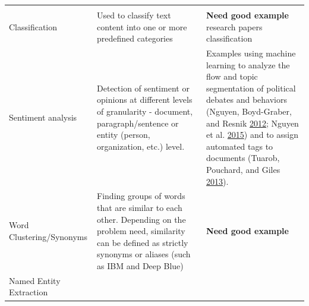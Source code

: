 \documentclass[]{krantz}
\begin{document}
\begin{longtable}[]{@{}lll@{}}
\begin{minipage}[t]{0.63\columnwidth}
\end{minipage}\tabularnewline
\begin{minipage}[t]{0.12\columnwidth}\raggedright\strut
Classification\strut
\end{minipage} & \begin{minipage}[t]{0.16\columnwidth}\raggedright\strut
Used to classify text content into one or more predefined
categories\strut
\end{minipage} & \begin{minipage}[t]{0.63\columnwidth}\raggedright\strut
\textbf{Need good example} research papers classification\strut
\end{minipage}\tabularnewline
\begin{minipage}[t]{0.12\columnwidth}\raggedright\strut
Sentiment analysis\strut
\end{minipage} & \begin{minipage}[t]{0.16\columnwidth}\raggedright\strut
Detection of sentiment or opinions at different levels of granularity -
document, paragraph/sentence or entity (person, organization, etc.)
level.\strut
\end{minipage} & \begin{minipage}[t]{0.63\columnwidth}\raggedright\strut
Examples using machine learning to analyze the flow and topic
segmentation of political debates and behaviors (Nguyen, Boyd-Graber,
and Resnik \protect\hyperlink{ref-nguyen-12}{2012}; Nguyen et al.
\protect\hyperlink{ref-Nguyen:Boyd-Graber:Resnik:Miler-2015}{2015}) and
to assign automated tags to documents (Tuarob, Pouchard, and Giles
\protect\hyperlink{ref-tuarob-13}{2013}).\strut
\end{minipage}\tabularnewline
\begin{minipage}[t]{0.12\columnwidth}\raggedright\strut
Word Clustering/Synonyms\strut
\end{minipage} & \begin{minipage}[t]{0.16\columnwidth}\raggedright\strut
Finding groups of words that are similar to each other. Depending on the
problem need, similarity can be defined as strictly synonyms or aliases
(such as IBM and Deep Blue)\strut
\end{minipage} & \begin{minipage}[t]{0.63\columnwidth}\raggedright\strut
\textbf{Need good example}\strut
\end{minipage}\tabularnewline
\begin{minipage}[t]{0.12\columnwidth}\raggedright\strut
Named Entity Extraction\strut
\end{minipage} & \begin{minipage}[t]{0.16\columnwidth}\raggedright\strut

\end{minipage}
\end{longtable}
\end{document}
